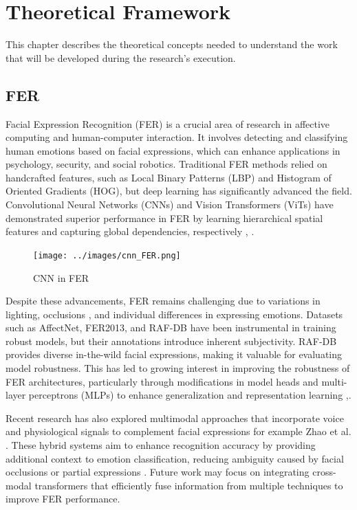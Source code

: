 \chapter{Theoretical Framework}
\label{chapter:theoretical-framework}


This chapter describes the theoretical concepts needed to understand the work that will be developed during the research's execution.


\section{FER}

Facial Expression Recognition (FER) is a crucial area of research in affective computing and human-computer interaction. It involves detecting and classifying human emotions based on facial expressions, which can enhance applications in psychology, security, and social robotics. Traditional FER methods relied on handcrafted features, such as Local Binary Patterns (LBP) and Histogram of Oriented Gradients (HOG), but deep learning has significantly advanced the field. Convolutional Neural Networks (CNNs) and Vision Transformers (ViTs) have demonstrated superior performance in FER by learning hierarchical spatial features and capturing global dependencies, respectively  \cite{zheng_poster_2022}, \cite{kollias_affect_2021}. 


\begin{figure}[H]
\centering
   \texttt{[image: ../images/cnn\_FER.png]}
\caption{CNN in FER}
\label{fig:cnn_FER}
\end{figure}

Despite these advancements, FER remains challenging due to variations in lighting, occlusions \cite{guo_occrob_2023}, and individual differences in expressing emotions. Datasets such as AffectNet, FER2013, and RAF-DB have been instrumental in training robust models, but their annotations introduce inherent subjectivity. RAF-DB provides diverse \gls{in-the-wild} facial expressions, making it valuable for evaluating model robustness. This has led to growing interest in improving the robustness of FER architectures, particularly through modifications in model heads and multi-layer perceptrons (MLPs) to enhance generalization and representation learning \cite{abdullah_activator_2024},\cite{yu_rethinking_2021}. 

Recent research has also explored multimodal approaches that incorporate voice and physiological signals to complement facial expressions for example Zhao et al. \cite{zhao_former-dfer_2021}. These hybrid systems aim to enhance recognition accuracy by providing additional context to emotion classification, reducing ambiguity caused by facial occlusions or partial expressions \cite{wang_survey_2024}. Future work may focus on integrating cross-modal transformers that efficiently fuse information from multiple techniques to improve FER performance. 

